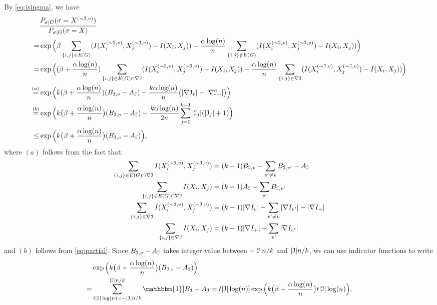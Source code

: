\documentclass{article}
\begin{document}
By \eqref{eq:isingma}, we have
\begin{equation} \label{eq:ts}
\begin{aligned}
& \frac{P_{\sigma|G}(\sigma=X^{(\sim\mathcal{I}, v)})}{P_{\sigma|G}(\sigma=X)} \\
= &\exp\Big(\beta\sum_{\{i,j\}\in E(G)} (I(X_i^{(\sim\mathcal{I}, v)}, X_j^{(\sim\mathcal{I}, v)})
-I(X_i,X_j))
-\frac{\alpha\log(n)}{n} \sum_{\{i,j\}\notin E(G)} (I(X_i^{(\sim\mathcal{I}, v)}, X_j^{(\sim\mathcal{I}, v)})
-I(X_i,X_j)) \Big) \\
=& \exp\Big((\beta+ \frac{\alpha \log(n)}{n})\sum_{\{i,j\}\in E(G) \cap \nabla \mathcal{I}} (I(X_i^{(\sim\mathcal{I}, v)}, X_j^{(\sim\mathcal{I}, v)})
-I(X_i,X_j))
-\frac{\alpha\log(n)}{n} \sum_{\{i,j\} \in \nabla \mathcal{I}}  (I(X_i^{(\sim\mathcal{I}, v)}, X_j^{(\sim\mathcal{I}, v)})
-I(X_i,X_j))\Big) \\
\overset{(a)}{=}  & \exp\Big( k(\beta+ \frac{\alpha \log(n)}{n})( B_{\mathcal{I},v} - A_{\mathcal{I}})
-\frac{k\alpha\log(n)}{n} \big( |\nabla \mathcal{I}_v | - | \nabla \mathcal{I}_+ | \big)\Big) \\
\overset{(b)}{=} & \exp\Big( k\big(\beta+\frac{\alpha\log(n)}{n} \big) (B_{\mathcal{I},v}-A_{\mathcal{I}})
- \frac{k\alpha\log(n)}{2n}\sum_{j=0}^{k-1} | \mathcal{I}_j | ( |\mathcal{I}_j| + 1)
\Big) \\
\le & \exp\Big( k\big(\beta+\frac{\alpha\log(n)}{n} \big) (B_{\mathcal{I},v}-A_{\mathcal{I}})
\Big) ,
\end{aligned}
\end{equation}
where $(a)$ follows from the fact that:
\begin{align*}
\sum_{\{i,j\}\in E(G) \cap \nabla \mathcal{I}} I(X_i^{(\sim\mathcal{I}, v)}, X_j^{(\sim\mathcal{I}, v)}) &= (k-1) B_{\mathcal{I}, v} - \sum_{v'\neq v} B_{\mathcal{I}, v'} - A_{\mathcal{I}} \\
\sum_{\{i,j\}\in E(G) \cap \nabla \mathcal{I}} I(X_i, X_j) &= (k-1)A_{\mathcal{I}} - \sum_{v'} B_{\mathcal{I}, v'} \\
\sum_{\{i,j\}\in \nabla \mathcal{I}} I(X_i^{(\sim\mathcal{I}, v)}, X_j^{(\sim\mathcal{I}, v)}) &= (k-1) |\nabla I_v| - \sum_{v'\neq v} | \nabla I_{v'}| - | \nabla I_{+}| \\
\sum_{\{i,j\}\in \nabla \mathcal{I}} I(X_i, X_j) &= (k-1) | \nabla I_{+} | - \sum_{v'} | \nabla I_{v'} |
\end{align*}
and $(b)$ follows from \eqref{eq:partial}.
Since $B_{\mathcal{I},v}-A_{\mathcal{I}}$ takes integer value between $-|\mathcal{I}|n/k$ and $|\mathcal{I}|n/k$,
we can use indicator functions to write
\begin{align*}
& \exp\Big(k\big(\beta+\frac{\alpha\log(n)}{n} \big) (B_{\cI,v}-A_{\cI}) \Big) \\
= & \sum_{t|\cI|\log(n)=-|\cI|n/k}^{|\cI|n/k}
\mathbbm{1}[B_{\cI}-A_{\cI}=t|\cI| \log(n)] \exp\Big(k\big(\beta+\frac{\alpha\log(n)}{n} \big) t|\cI| \log(n) \Big) ,
\end{align*}
\end{document}
